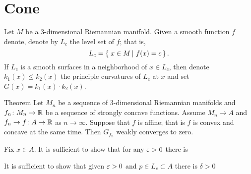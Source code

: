 \section{Cone}

Let $M$ be a 3-dimensional Riemannian manifold.
Given a smooth function $f$ denote, denote by $L_c$ the level set of $f$;
that is,
\[L_c=\set{x\in M}{f(x)=c}.\]
If $L_c$ is a smooth surfaces in a neighborhood of $x\in L_c$,
then denote $k_1(x)\le k_2(x)$ the principle curvatures of $L_c$ at $x$
and set $G(x)=k_1(x)\cdot k_2(x)$.

\begin{thm}{Theorem}
Let $M_n$ be a sequence of $3$-dimensional Riemannian manifolds
and $f_n\colon M_n\to \mathbb{R}$ be a sequence of strongly concave functions.
Assume $M_n\to A$ and $f_n\to f\colon A\to \mathbb{R}$ as $n\to \infty$.
Suppose that $f$ is affine; that is $f$ is convex and concave at the same time.
Then $G_{f_n}$ weakly converges to zero.
\end{thm}

Fix $x\in A$.
It is sufficient to show that for any $\varepsilon>0$ there is 

It is sufficient to show that given $\varepsilon>0$ and $p\in L_c\subset A$ there is $\delta>0$

\qeds

